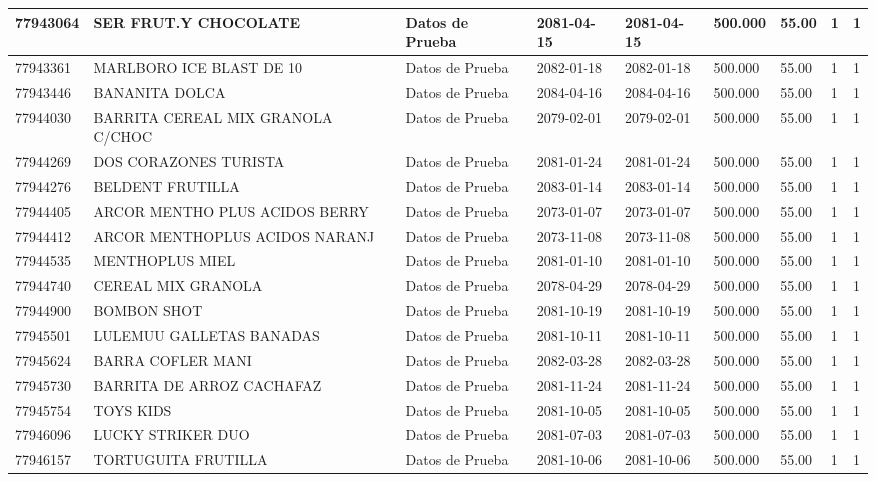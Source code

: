 \documentclass[a4paper,12pt]{article}
\begin{document}
\begin{landscape}
\begin{longtable}{|p{4cm}|p{2.5cm}|p{2.5cm}|p{1.8cm}|p{1.8cm}|p{1cm}|p{1cm}|p{3cm}|p{3cm}||}
77943064 & SER FRUT.Y CHOCOLATE & Datos de Prueba & 2081-04-15 & 2081-04-15 & 500.000 & 55.00 & 1 & 1 \\ \hline 
77943361 & MARLBORO  ICE  BLAST   DE  10 & Datos de Prueba & 2082-01-18 & 2082-01-18 & 500.000 & 55.00 & 1 & 1 \\ \hline 
77943446 & BANANITA  DOLCA & Datos de Prueba & 2084-04-16 & 2084-04-16 & 500.000 & 55.00 & 1 & 1 \\ \hline 
77944030 & BARRITA CEREAL MIX GRANOLA C/CHOC & Datos de Prueba & 2079-02-01 & 2079-02-01 & 500.000 & 55.00 & 1 & 1 \\ \hline 
77944269 & DOS CORAZONES TURISTA & Datos de Prueba & 2081-01-24 & 2081-01-24 & 500.000 & 55.00 & 1 & 1 \\ \hline 
77944276 & BELDENT FRUTILLA & Datos de Prueba & 2083-01-14 & 2083-01-14 & 500.000 & 55.00 & 1 & 1 \\ \hline 
77944405 & ARCOR MENTHO PLUS ACIDOS BERRY & Datos de Prueba & 2073-01-07 & 2073-01-07 & 500.000 & 55.00 & 1 & 1 \\ \hline 
77944412 & ARCOR MENTHOPLUS ACIDOS NARANJ & Datos de Prueba & 2073-11-08 & 2073-11-08 & 500.000 & 55.00 & 1 & 1 \\ \hline 
77944535 & MENTHOPLUS MIEL & Datos de Prueba & 2081-01-10 & 2081-01-10 & 500.000 & 55.00 & 1 & 1 \\ \hline 
77944740 & CEREAL MIX GRANOLA & Datos de Prueba & 2078-04-29 & 2078-04-29 & 500.000 & 55.00 & 1 & 1 \\ \hline 
77944900 & BOMBON SHOT & Datos de Prueba & 2081-10-19 & 2081-10-19 & 500.000 & 55.00 & 1 & 1 \\ \hline 
77945501 & LULEMUU GALLETAS BANADAS & Datos de Prueba & 2081-10-11 & 2081-10-11 & 500.000 & 55.00 & 1 & 1 \\ \hline 
77945624 & BARRA COFLER MANI & Datos de Prueba & 2082-03-28 & 2082-03-28 & 500.000 & 55.00 & 1 & 1 \\ \hline 
77945730 & BARRITA DE ARROZ CACHAFAZ & Datos de Prueba & 2081-11-24 & 2081-11-24 & 500.000 & 55.00 & 1 & 1 \\ \hline 
77945754 & TOYS KIDS & Datos de Prueba & 2081-10-05 & 2081-10-05 & 500.000 & 55.00 & 1 & 1 \\ \hline 
77946096 & LUCKY STRIKER DUO & Datos de Prueba & 2081-07-03 & 2081-07-03 & 500.000 & 55.00 & 1 & 1 \\ \hline 
77946157 & TORTUGUITA FRUTILLA & Datos de Prueba & 2081-10-06 & 2081-10-06 & 500.000 & 55.00 & 1 & 1 \\ \hline 

\end{longtable}
\end{landscape}
\end{document}
